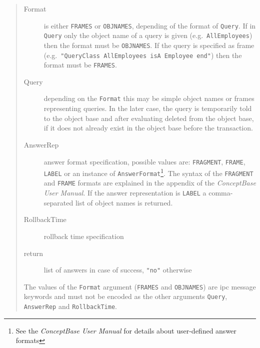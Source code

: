 
\begin{quote}
\begin{description}
\item[Format] is either \verb+FRAMES+ or \verb+OBJNAMES+, depending of the format of {\tt Query}.
If in {\tt Query} only the object name of a query is given (e.g.\ {\tt AllEmployees}) then
the format must be \verb+OBJNAMES+. If the query is specified as frame
(e.g.\ {\tt "QueryClass AllEmployees isA Employee end"}) then the format must be \verb+FRAMES+.

\item[Query] depending on the {\tt Format} this may be simple object names or frames
representing queries. In the later case, the query is temporarily told to the object base
and after evaluating deleted from the object base, if it does not already exist in the object
base before the transaction.

\item[AnswerRep] answer format specification, possible values are:
{\tt  FRAGMENT}, {\tt FRAME}, {\tt LABEL} or an instance of {\tt AnswerFormat}\footnote{See the {\em ConceptBase User Manual}
for details about user-defined answer formats}. The syntax of the {\tt FRAGMENT} and {\tt FRAME} formats are
explained in the appendix of the {\em ConceptBase User Manual}. If the answer representation is {\tt LABEL}
a comma-separated list of object names is returned.
\item[RollbackTime] rollback time specification
\item[return] list of answers in case of success, \verb+"no"+ otherwise
\end{description}

The values of the {\tt Format} argument (\verb+FRAMES+ and \verb+OBJNAMES+) are ipc message
keywords and must not be encoded as the other arguments {\tt Query}, {\tt AnswerRep} and {\tt RollbackTime}.
\end{quote}


